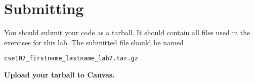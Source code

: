 \documentclass[11pt]{cselabheader}
\begin{document}
\pagebreak
\section{Submitting}

You should submit your code as a tarball. It should contain all files
used in the exercises for this lab. The submitted file should be named
\begin{center}
  \texttt{cse107\_firstname\_lastname\_lab7.tar.gz}
\end{center}

\begin{center}
  \textbf{Upload your tarball to Canvas.}
\end{center}

\listoftheorems
\end{document}
